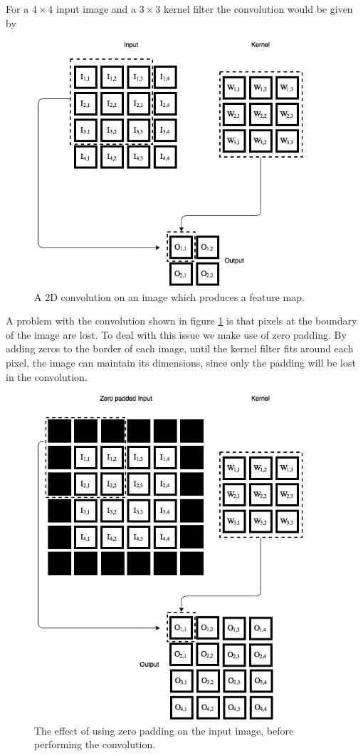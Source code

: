 \documentclass[11pt]{article}
\begin{document}
For a $4 \times 4$ input image and a $3 \times 3$ kernel filter the convolution
would be given by
\begin{figure}[H]
    \centering
    \includegraphics[width=10cm]{include/conv_2.png}
    \caption{A 2D convolution on an image which produces a feature map.}
    \label{fig:conv}
\end{figure}
A problem with the convolution shown in figure \ref{fig:conv} is that
pixels at the boundary of the image are lost.
To deal with this issue we make use of zero padding.
By adding zeros to the border of each image, until the kernel
filter fits around each pixel, the image can maintain its dimensions, since
only the padding will be lost in the convolution.
\begin{figure}[H]
    \centering
    \includegraphics[width=10cm]{include/conv_2_zero_pad.png}
    \caption{The effect of using zero padding on the input image,
             before performing the convolution.}
    \label{fig:conv2}
\end{figure}
\end{document}
